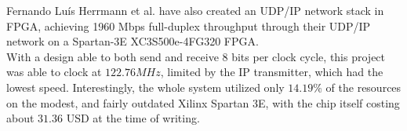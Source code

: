 Fernando Lu{\'i}s Herrmann et al. have also created an UDP/IP network stack
in FPGA, achieving 1960 Mbps full-duplex throughput through their UDP/IP
network on a Spartan-3E XC3S500e-4FG320 FPGA\cite{Herrmann2009ANU}.\\
With a design able to both send and receive 8 bits per clock cycle, this
project was able to clock at $122.76 MHz$, limited by the IP transmitter, which
had the lowest speed. Interestingly, the whole system utilized only $14.19\%$
of the resources on the modest, and fairly outdated Xilinx Spartan 3E, with the
chip itself costing about $31.36$ USD at the time of writing\cite{XC3S500E}.





